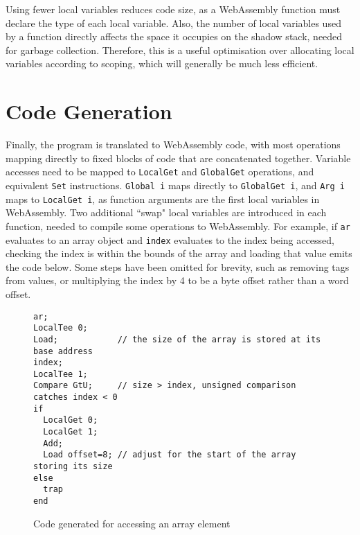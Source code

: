 Using fewer local variables reduces code size, as a WebAssembly function must declare the type of each local variable.
Also, the number of local variables used by a function directly affects the space it occupies on the shadow stack, needed for garbage collection. Therefore, this is a useful optimisation over allocating local variables according to scoping, which will generally be much less efficient.


\section{Code Generation}

Finally, the program is translated to WebAssembly code, with most operations mapping directly to fixed blocks of code that are concatenated together. Variable accesses need to be mapped to \verb|LocalGet| and \verb|GlobalGet| operations, and equivalent \verb|Set| instructions. \verb|Global i| maps directly to \verb|GlobalGet i|, and \verb|Arg i| maps to \verb|LocalGet i|, as function arguments are the first local variables in WebAssembly. Two additional ``swap" local variables are introduced in each function, needed to compile some operations to WebAssembly. 
For example, if \verb|ar| evaluates to an array object and \verb|index| evaluates to the index being accessed, checking the index is within the bounds of the array and loading that value emits the code below. Some steps have been omitted for brevity, such as removing tags from values, or multiplying the index by 4 to be a byte offset rather than a word offset.

\begin{figure}[H]
\begin{verbatim}
ar; 
LocalTee 0;
Load;            // the size of the array is stored at its base address
index; 
LocalTee 1; 
Compare GtU;     // size > index, unsigned comparison catches index < 0
if
  LocalGet 0;
  LocalGet 1;
  Add;
  Load offset=8; // adjust for the start of the array storing its size
else
  trap 
end
\end{verbatim}
\caption{Code generated for accessing an array element}
\end{figure}

